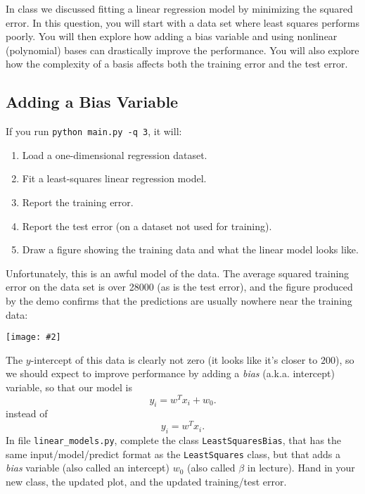 \documentclass{article}
\def\blu#1{{\color{blu}#1}}
\newcommand{\centerfig}[2]{\begin{center}\texttt{[image: \#2]}\end{center}}
\def\enum#1{\begin{enumerate}#1\end{enumerate}}
\begin{document}
In class we discussed fitting a linear regression model by minimizing the squared error.
In this question, you will start with a data set where least squares performs poorly.
You will then explore how adding a bias variable and using nonlinear (polynomial) bases can drastically improve the performance.
You will also explore how the complexity of a basis affects both the training error and the test error.

\subsection{Adding a Bias Variable}

\label{biasvar}
If you run  \verb|python main.py -q 3|, it will:
\enum{
\item Load a one-dimensional regression dataset.
\item Fit a least-squares linear regression model.
\item Report the training error.
\item Report the test error (on a dataset not used for training).
\item Draw a figure showing the training data and what the linear model looks like.
}
Unfortunately, this is an awful model of the data. The average squared training error on the data set is over 28000
(as is the test error), and the figure produced by the demo confirms that the predictions are usually nowhere near
 the training data:
\centerfig{.5}{../figs/least_squares_no_bias.pdf}
The $y$-intercept of this data is clearly not zero (it looks like it's closer to $200$),
so we should expect to improve performance by adding a \emph{bias} (a.k.a. intercept) variable, so that our model is
\[
y_i = w^Tx_i + w_0.
\]
instead of
\[
y_i = w^Tx_i.
\]
\blu{In file \texttt{linear\string_models.py}, complete the class \texttt{LeastSquaresBias},
that has the same input/model/predict format as the \texttt{LeastSquares} class,
but that adds a \emph{bias} variable (also called an intercept) $w_0$ (also called $\beta$ in lecture). Hand in your new class, the updated plot,
and the updated training/test error.}
\end{document}
